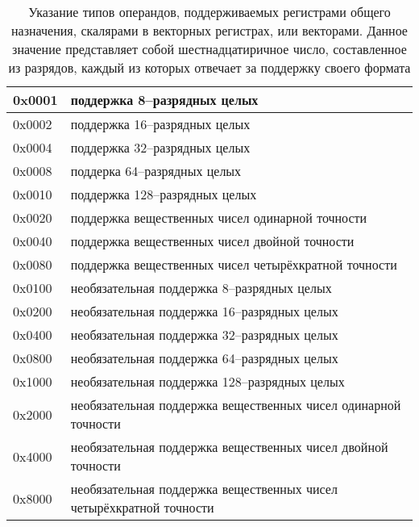 \documentclass[forwardcom.tex]{subfiles}
\begin{document}
\begin{longtable} {|p{18mm}|p{100mm}|}
\caption{Указание типов операндов, поддерживаемых регистрами общего назначения, скалярами в векторных регистрах, или векторами. Данное значение представляет собой шестнадцатиричное число, составленное из разрядов, каждый из которых отвечает за поддержку своего формата} 
\label{table:OperandTypesInInstructionList} \\
\endfirsthead
\endhead
\hline
0x0001 & поддержка 8--разрядных целых                                        \\ 	\hline
0x0002 & поддержка 16--разрядных целых                                       \\ 	\hline
0x0004 & поддержка 32--разрядных целых                                       \\ 	\hline
0x0008 & поддерка 64--разрядных целых                                        \\ 	\hline
0x0010 & поддержка 128--разрядных целых                                      \\ 	\hline
0x0020 & поддержка вещественных чисел одинарной точности                     \\ 	\hline
0x0040 & поддержка вещественных чисел двойной точности                       \\ 	\hline
0x0080 & поддержка вещественных чисел четырёхкратной точности                \\ 	\hline
0x0100 & необязательная поддержка 8--разрядных целых                         \\ 	\hline
0x0200 & необязательная поддержка 16--разрядных целых                        \\ 	\hline
0x0400 & необязательная поддержка 32--разрядных целых                        \\ 	\hline
0x0800 & необязательная поддержка 64--разрядных целых                        \\ 	\hline
0x1000 & необязательная поддержка 128--разрядных целых                       \\ 	\hline
0x2000 & необязательная поддержка вещественных чисел одинарной точности      \\ 	\hline
0x4000 & необязательная поддержка вещественных чисел двойной точности        \\ 	\hline
0x8000 & необязательная поддержка вещественных чисел четырёхкратной точности \\ 	\hline
\end{longtable}
\end{document}
